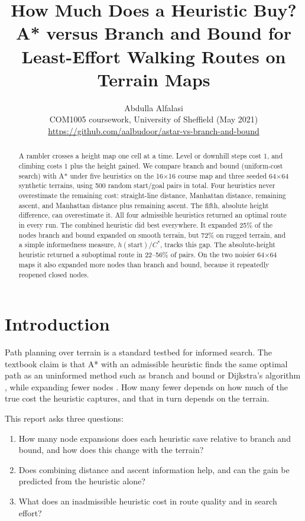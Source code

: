 \documentclass[11pt]{article}
\title{\Huge\bfseries How Much Does a Heuristic Buy?\\[6pt]
\Large\bfseries A* versus Branch and Bound for Least-Effort Walking Routes on Terrain Maps}
\author{Abdulla Alfalasi\\
\small COM1005 coursework, University of Sheffield (May 2021)\\
\small \url{https://github.com/aalbudoor/astar-vs-branch-and-bound}}
\date{}
\begin{document}
\maketitle

\begin{abstract}
A rambler crosses a height map one cell at a time. Level or downhill steps cost 1, and climbing costs 1 plus the height gained. We compare branch and bound (uniform-cost search) with A* under five heuristics on the 16$\times$16 course map and three seeded 64$\times$64 synthetic terrains, using 500 random start/goal pairs in total. Four heuristics never overestimate the remaining cost: straight-line distance, Manhattan distance, remaining ascent, and Manhattan distance plus remaining ascent. The fifth, absolute height difference, can overestimate it. All four admissible heuristics returned an optimal route in every run. The combined heuristic did best everywhere. It expanded 25\% of the nodes branch and bound expanded on smooth terrain, but 72\% on rugged terrain, and a simple informedness measure, $h(\text{start})/C^*$, tracks this gap. The absolute-height heuristic returned a suboptimal route in 22--56\% of pairs. On the two noisier 64$\times$64 maps it also expanded more nodes than branch and bound, because it repeatedly reopened closed nodes.
\end{abstract}

\section{Introduction}
Path planning over terrain is a standard testbed for informed search. The textbook claim is that A* with an admissible heuristic finds the same optimal path as an uninformed method such as branch and bound or Dijkstra's algorithm \citep{dijkstra1959note,lawler1966branch}, while expanding fewer nodes \citep{hart1968formal,dechter1985generalized}. How many fewer depends on how much of the true cost the heuristic captures, and that in turn depends on the terrain.

This report asks three questions:
\begin{enumerate}
  \item How many node expansions does each heuristic save relative to branch and bound, and how does this change with the terrain?
  \item Does combining distance and ascent information help, and can the gain be predicted from the heuristic alone?
  \item What does an inadmissible heuristic cost in route quality and in search effort?
\end{enumerate}
\end{document}
